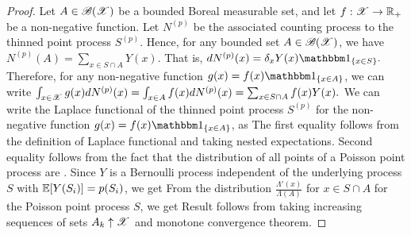 \documentclass[a4paper,english,10pt]{article}
\begin{document}
\begin{proof}
Let $A \in \mathscr{B}(\mathscr{X})$ be a bounded Boreal measurable set, and let $f: \mathscr{X} \to \mathbb{R}_+$ be a non-negative function. 
Let $N^{(p)}$ be the associated counting process to the thinned point process $S^{(p)}$. 
Hence, for any bounded set $A \in \mathscr{B}(\mathscr{X})$, we have $N^{(p)}(A) = \sum_{x \in S \cap A}Y(x)$. 
That is, 
$
dN^{(p)}(x) 
= \delta_{x}Y(x)\SetIn{x \in S}.
$
Therefore, for any non-negative function $g(x) = f(x)\SetIn{x \in A}$, we can write 
$
\int_{x \in \mathscr{X}}g(x)dN^{(p)}(x) 
= \int_{x \in A}f(x)dN^{(p)}(x) 
= \sum_{x \in S\cap A}f(x)Y(x).
$
We can write the Laplace functional of the thinned point process $S^{(p)}$ for the non-negative function $g(x) = f(x)\SetIn{x \in A}$, as 
The first equality follows from the definition of Laplace functional and taking nested expectations. 
Second equality follows from the fact that the distribution of all points of a Poisson point process are  \iid. 
Since $Y$ is a Bernoulli process independent of the underlying process $S$ with $\mathbb{E}[Y(S_i)] = p(S_i)$, we get 
From the distribution $\frac{\Lambda'(x)}{\Lambda(A)}$ for $x \in S \cap A$ for the Poisson point process $S$, we get  
Result follows from taking increasing sequences of sets $A_k \uparrow \mathscr{X}$ and monotone convergence theorem.
\end{proof}
\end{document}
